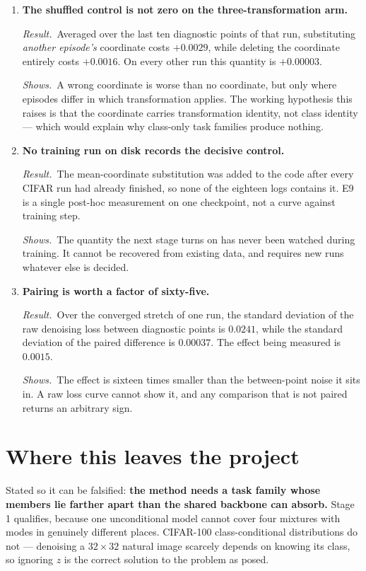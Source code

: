 \documentclass[11pt]{article}
\newcommand{\res}{\par\smallskip\textit{Result.}\ }
\newcommand{\shows}{\par\smallskip\textit{Shows.}\ }
\begin{document}
\begin{enumerate}[resume]

\item \textbf{The shuffled control is not zero on the three-transformation arm.}
\res Averaged over the last ten diagnostic points of that run, substituting \emph{another
episode's} coordinate costs $+0.0029$, while deleting the coordinate entirely costs
$+0.0016$. On every other run this quantity is $+0.00003$.
\shows A wrong coordinate is worse than no coordinate, but only where episodes differ in
which transformation applies. The working hypothesis this raises is that the coordinate
carries transformation identity, not class identity --- which would explain why class-only
task families produce nothing.

\item \textbf{No training run on disk records the decisive control.}
\res The mean-coordinate substitution was added to the code after every CIFAR run had
already finished, so none of the eighteen logs contains it. E9 is a single post-hoc
measurement on one checkpoint, not a curve against training step.
\shows The quantity the next stage turns on has never been watched during training. It
cannot be recovered from existing data, and requires new runs whatever else is decided.

\item \textbf{Pairing is worth a factor of sixty-five.}
\res Over the converged stretch of one run, the standard deviation of the raw denoising
loss between diagnostic points is $0.0241$, while the standard deviation of the paired
difference is $0.00037$. The effect being measured is $0.0015$.
\shows The effect is sixteen times smaller than the between-point noise it sits in. A raw
loss curve cannot show it, and any comparison that is not paired returns an arbitrary sign.

\end{enumerate}

\section{Where this leaves the project}

Stated so it can be falsified: \textbf{the method needs a task family whose members lie
farther apart than the shared backbone can absorb.} Stage 1 qualifies, because one
unconditional model cannot cover four mixtures with modes in genuinely different places.
CIFAR-100 class-conditional distributions do not --- denoising a $32 \times 32$ natural
image scarcely depends on knowing its class, so ignoring $z$ is the correct solution to the
problem as posed.
\end{document}

